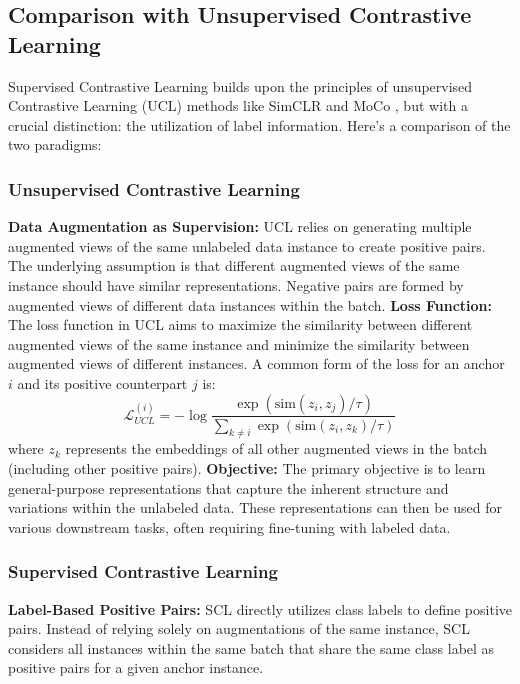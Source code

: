 \subsection{Comparison with Unsupervised Contrastive Learning}

Supervised Contrastive Learning builds upon the principles of unsupervised Contrastive Learning (UCL) methods like SimCLR \cite{chen2020simple} and MoCo \cite{he2020momentum}, but with a crucial distinction: the utilization of label information. Here's a comparison of the two paradigms:

\subsubsection{Unsupervised Contrastive Learning}

\textbf{Data Augmentation as Supervision:} UCL relies on generating multiple augmented views of the same unlabeled data instance to create positive pairs. The underlying assumption is that different augmented views of the same instance should have similar representations. Negative pairs are formed by augmented views of different data instances within the batch.
\textbf{Loss Function:} The loss function in UCL aims to maximize the similarity between different augmented views of the same instance and minimize the similarity between augmented views of different instances. A common form of the loss for an anchor $i$ and its positive counterpart $j$ is:
    $$
    \mathcal{L}_{UCL}^{(i)} = - \log \frac{\exp(\text{sim}(z_i, z_j) / \tau)}{\sum_{k \neq i} \exp(\text{sim}(z_i, z_k) / \tau)}
    $$
    where $z_k$ represents the embeddings of all other augmented views in the batch (including other positive pairs).
\textbf{Objective:} The primary objective is to learn general-purpose representations that capture the inherent structure and variations within the unlabeled data. These representations can then be used for various downstream tasks, often requiring fine-tuning with labeled data.

\subsubsection{Supervised Contrastive Learning}

\textbf{Label-Based Positive Pairs:} SCL directly utilizes class labels to define positive pairs. Instead of relying solely on augmentations of the same instance, SCL considers all instances within the same batch that share the same class label as positive pairs for a given anchor instance.

